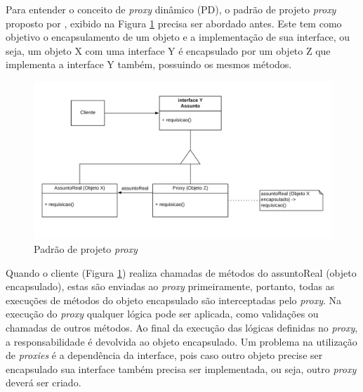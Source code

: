 \par Para entender o conceito de \textit{proxy} dinâmico (PD), o padrão de projeto \textit{proxy} proposto por , exibido na Figura \ref{fig:proxy-pattern} precisa ser abordado antes. Este tem como objetivo o encapsulamento de um objeto e a implementação de sua interface, ou seja, um objeto X com uma interface Y é encapsulado por um objeto Z que implementa a interface Y também, possuindo os mesmos métodos.

\begin{figure}[H]
    \centering
    \includegraphics[scale=0.2]{src/imagens/cap2/proxy-pattern-criado.png}
    \caption{Padrão de projeto \textit{proxy}}
    \label{fig:proxy-pattern}
\end{figure}

\par Quando o cliente (Figura \ref{fig:proxy-pattern}) realiza chamadas de métodos do assuntoReal (objeto encapsulado), estas são enviadas ao \textit{proxy} primeiramente, 
portanto, todas as execuções de métodos do objeto encapsulado são interceptadas pelo \textit{proxy}. Na execução do \textit{proxy} qualquer lógica pode ser aplicada, como validações ou chamadas de outros métodos. Ao final da execução das lógicas definidas no \textit{proxy}, a responsabilidade é devolvida ao objeto encapsulado. Um problema na utilização de \textit{proxies} é a dependência da interface, pois caso outro objeto precise ser encapsulado sua interface também precisa ser implementada, ou seja, outro \textit{proxy} deverá ser criado.

